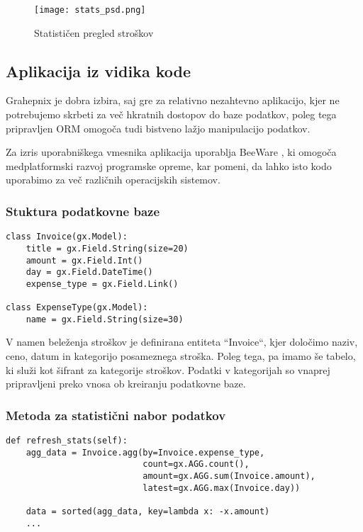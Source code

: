 \documentclass[a4paper,12pt,openright]{book}
\begin{document}
    \begin{figure}[H]
        \centerline{\texttt{[image: stats\_psd.png]}}
        \caption{Statističen pregled stroškov}
        \label{stats_screen}
    \end{figure}

    \subsection{Aplikacija iz vidika kode}

    Grahepnix je dobra izbira, saj gre za relativno nezahtevno aplikacijo, kjer ne potrebujemo skrbeti za več hkratnih dostopov do baze podatkov, poleg tega pripravljen ORM omogoča tudi bistveno lažjo manipulacijo podatkov.

    Za izris uporabniškega vmesnika aplikacija uporablja BeeWare \cite{BEE_WARE}, ki omogoča medplatformski razvoj programske opreme, kar pomeni, da lahko isto kodo uporabimo za več različnih operacijskih sistemov.

    \subsubsection{Stuktura podatkovne baze}

\begin{verbatim}
class Invoice(gx.Model):
    title = gx.Field.String(size=20)
    amount = gx.Field.Int()
    day = gx.Field.DateTime()
    expense_type = gx.Field.Link()

class ExpenseType(gx.Model):
    name = gx.Field.String(size=30)
\end{verbatim}

    \noindent
    V namen beleženja stroškov je definirana entiteta ``Invoice``, kjer določimo naziv, ceno, datum in kategorijo posameznega stroška.
    Poleg tega, pa imamo še tabelo, ki služi kot šifrant za kategorije stroškov. Podatki v kategorijah so vnaprej pripravljeni preko vnosa ob kreiranju podatkovne baze.

    \subsubsection{Metoda za statistični nabor podatkov}

\begin{verbatim}
def refresh_stats(self):
    agg_data = Invoice.agg(by=Invoice.expense_type,
                           count=gx.AGG.count(), 
                           amount=gx.AGG.sum(Invoice.amount), 
                           latest=gx.AGG.max(Invoice.day))
    
    data = sorted(agg_data, key=lambda x: -x.amount)
    ...
\end{verbatim}
\end{document}
